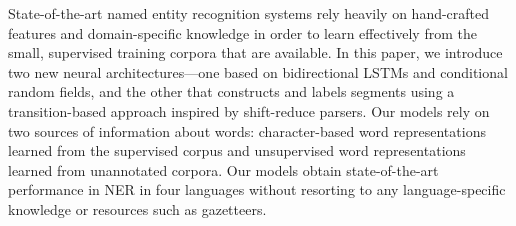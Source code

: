 State-of-the-art named entity recognition systems rely heavily on hand-crafted features and domain-specific knowledge in order to learn effectively from the small, supervised training corpora that are available. In this paper, we introduce two new neural architectures---one based on bidirectional LSTMs and conditional random fields, and the other that constructs and labels segments using a transition-based approach inspired by shift-reduce parsers. Our models rely on two sources of information about words: character-based word representations learned from the supervised corpus and unsupervised word representations learned from unannotated corpora. Our models obtain state-of-the-art performance in NER in four languages without resorting to any language-specific knowledge or resources such as gazetteers.
